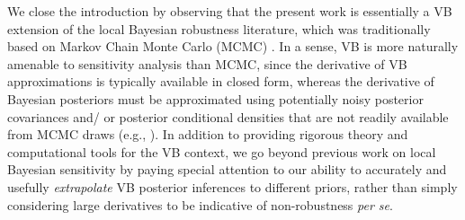 We close the introduction by observing that  the present work is essentially a
VB extension of the local Bayesian robustness literature, which was
traditionally based on Markov Chain Monte Carlo (MCMC)
\citet{gustafson:1996:local, basu:1996:local}.  In a sense, VB is more naturally
amenable to sensitivity analysis than MCMC, since the derivative of VB
approximations is typically available in closed form, whereas the derivative of
Bayesian posteriors must be approximated using potentially noisy posterior
covariances and/ or posterior conditional densities that are not readily
available from MCMC draws (e.g., \citet{gustafson:1996:marginal}).  In addition
to providing rigorous theory and computational tools for the VB context, we go
beyond previous work on local Bayesian sensitivity by paying special attention
to our ability to accurately and usefully \textit{extrapolate} VB posterior
inferences to different priors, rather than simply considering large derivatives
to be indicative of non-robustness \textit{per se}.
